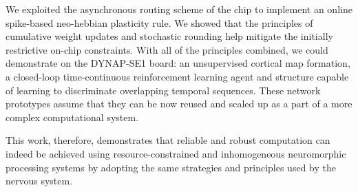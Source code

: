 We exploited the asynchronous routing scheme of the chip to implement an online spike-based neo-hebbian plasticity rule. We showed that the principles of cumulative weight updates and stochastic rounding help mitigate the initially restrictive on-chip constraints.
With all of the principles combined, we could demonstrate on the DYNAP-SE1 board: an unsupervised cortical map formation, a closed-loop time-continuous reinforcement learning agent and structure capable of learning to discriminate overlapping temporal sequences. These network prototypes assume that they can be now reused and scaled up as a part of a more complex computational system.

This work, therefore, demonstrates that reliable and robust computation can indeed be achieved using resource-constrained and inhomogeneous neuromorphic processing systems by adopting the same strategies and principles used by the nervous system.